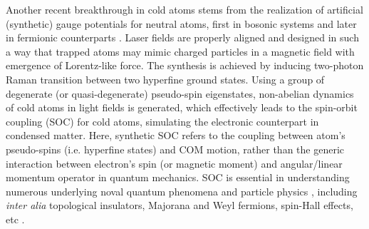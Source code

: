 \documentclass[atoms,article,submit,moreauthors,pdftex,12pt,a4paper]{mdpi}
\begin{document}
Another recent breakthrough in cold atoms stems from the realization of artificial (synthetic) gauge potentials for neutral atoms, first in bosonic systems \cite{soc1, soc2} and later in fermionic counterparts \cite{soc3, soc4}. Laser fields are properly aligned and designed in such a way that trapped atoms may mimic charged particles in a magnetic field with emergence of Lorentz-like force. The synthesis is achieved by inducing two-photon Raman transition between two hyperfine ground states. Using a group of degenerate (or quasi-degenerate) pseudo-spin eigenstates, non-abelian dynamics of cold atoms in light fields is generated, which effectively leads to the spin-orbit coupling (SOC) for cold atoms, simulating the  electronic counterpart in condensed matter. Here, synthetic SOC refers to the coupling between atom's pseudo-spins (i.e. hyperfine states) and COM motion, rather than the generic interaction between electron's spin (or magnetic moment) and angular/linear momentum operator in quantum mechanics. SOC is essential in understanding numerous underlying noval quantum phenomena and particle physics \cite{socVictor}, including {\em inter alia} topological insulators, Majorana and Weyl fermions, spin-Hall effects, etc \cite{TI, MF, WF, SHE1, SHE2}. 
\end{document}
